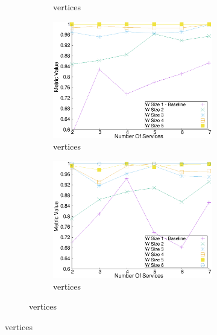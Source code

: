 \begin{figure}[H]
\begin{adjustbox}{minipage=\linewidth,scale=0.75}
\begin{subfigure}{0.45\textwidth}
\begin{subfigure}{\textwidth}
            \caption{ vertices}
            \label{fig:quality_window_wide_perce_n4}
          \end{subfigure}
          \begin{subfigure}{\textwidth}
            \includegraphics[width=\textwidth]{Images/graphs/window_quality_performance_diff_perce_n7_s7_20_100_n5}
            \caption{ vertices}

            \label{fig:quality_window_wide_perce_n5}
          \end{subfigure}

          \begin{subfigure}{\textwidth}
            \includegraphics[width=\textwidth]{Images/graphs/window_quality_performance_diff_perce_n7_s7_20_100_n6}
            \caption{ vertices}
            \label{fig:quality_window_wide_perce_n6}
          \end{subfigure}


\end{subfigure}
\end{adjustbox}
\end{figure}
